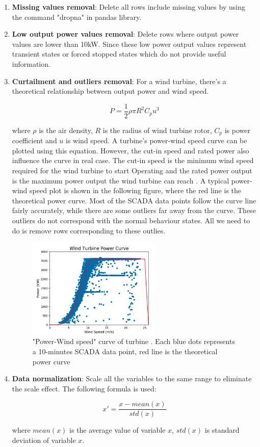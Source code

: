 \begin{enumerate}
\item \textbf{Missing values removal}: Delete all rows include missing values by using the command "dropna" in pandas library.

\item \textbf{Low output power values removal}: Delete rows where output power values are lower than 10kW. Since these low power output values represent transient states or forced stopped states which do not provide useful information.

\item \textbf{Curtailment and outliers removal}: For a wind turbine, there's a theoretical relationship between output power and wind speed.

$$P = \frac{1}{2}\rho \pi R^2 C_p u^3$$

where $\rho$ is the air density, $R$ is the radius of wind turbine rotor, $C_p$ is power coefficient and $u$ is wind speed. A turbine's power-wind speed curve can be plotted using this equation. However, the cut-in speed and rated power also influence the curve in real case. The cut-in speed is the minimum wind speed required for the wind turbine to start Operating and the rated power output is the maximum power output the wind turbine can reach \cite{Sofia}. A typical power-wind speed plot is shown in the following figure, where the red line is the theoretical power curve. Most of the SCADA data points follow the curve line fairly accurately, while there are some outliers far away from the curve. These outliers do not correspond with the normal behaviour states. All we need to do is remove rows corresponding to these outlies.

\begin{figure}[]
\centering
\includegraphics[width=0.6\textwidth]{figures/wind_power_curve.jpg}
\caption{"Power-Wind speed" curve of turbine \cite{Sofia}. Each blue dots represents a 10-minutes SCADA data point, red line is the theoretical power curve}
\label{fig:B-B1}
\end{figure}

\item \textbf{Data normalization}: Scale all the variables to the same range to eliminate the scale effect. The following formula is used:

$$x' = \frac{x-mean(x)}{std(x)}$$

where $mean(x)$ is the average value of variable $x$, $std(x)$ is standard deviation of variable $x$.

\end{enumerate}

